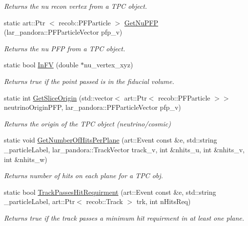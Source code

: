 \begin{DoxyCompactItemize}
\begin{DoxyCompactList}\small\item\em \-Returns the nu recon vertex from a \-T\-P\-C object. \end{DoxyCompactList}\item 
static art\-::\-Ptr\*
$<$ recob\-::\-P\-F\-Particle $>$ \hyperlink{classUBXSecHelper_a1803584104e1b6f618fe86b28aec1927}{\-Get\-Nu\-P\-F\-P} (lar\-\_\-pandora\-::\-P\-F\-Particle\-Vector pfp\-\_\-v)
\begin{DoxyCompactList}\small\item\em \-Returns the nu \-P\-F\-P from a \-T\-P\-C object. \end{DoxyCompactList}\item 
static bool \hyperlink{classUBXSecHelper_a4ff7e0d6774d5628cc2a3d19bb2d3492}{\-In\-F\-V} (double $\ast$nu\-\_\-vertex\-\_\-xyz)
\begin{DoxyCompactList}\small\item\em \-Returns true if the point passed is in the fiducial volume. \end{DoxyCompactList}\item 
static int \hyperlink{classUBXSecHelper_ade125cef08f3f9ab1562556e7ae977d1}{\-Get\-Slice\-Origin} (std\-::vector$<$ art\-::\-Ptr$<$ recob\-::\-P\-F\-Particle $>$$>$ neutrino\-Origin\-P\-F\-P, lar\-\_\-pandora\-::\-P\-F\-Particle\-Vector pfp\-\_\-v)
\begin{DoxyCompactList}\small\item\em \-Returns the origin of the \-T\-P\-C object (neutrino/cosmic) \end{DoxyCompactList}\item 
static void \hyperlink{classUBXSecHelper_a5d811318d7fb66ab5e1816453c017e63}{\-Get\-Number\-Of\-Hits\-Per\-Plane} (art\-::\-Event const \&e, std\-::string \-\_\-particle\-Label, lar\-\_\-pandora\-::\-Track\-Vector track\-\_\-v, int \&nhits\-\_\-u, int \&nhits\-\_\-v, int \&nhits\-\_\-w)
\begin{DoxyCompactList}\small\item\em \-Returns number of hits on each plane for a \-T\-P\-C obj. \end{DoxyCompactList}\item 
static bool \hyperlink{classUBXSecHelper_accf62c400d9e984f1277843de78715a7}{\-Track\-Passes\-Hit\-Requirment} (art\-::\-Event const \&e, std\-::string \-\_\-particle\-Label, art\-::\-Ptr$<$ recob\-::\-Track $>$ trk, int n\-Hits\-Req)
\begin{DoxyCompactList}\small\item\em \-Returns true if the track passes a minimum hit requirment in at least one plane. \end{DoxyCompactList}\item 
$$
\end{DoxyCompactItemize}
